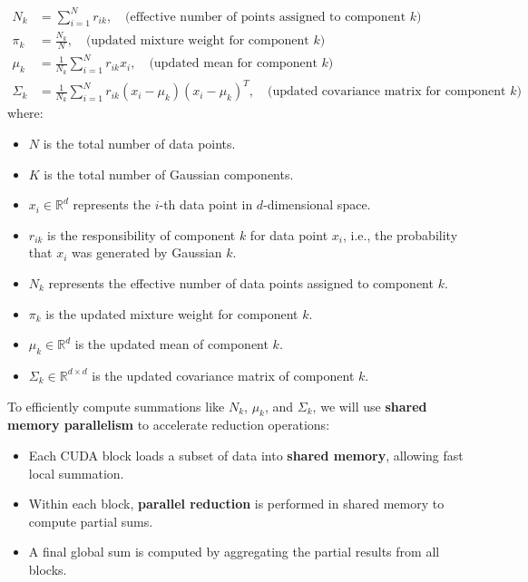 \documentclass{article}
\begin{document}
\begin{align}
    N_k &= \sum_{i=1}^{N} r_{ik}, \quad \text{(effective number of points assigned to component } k\text{)} \\
    \pi_k &= \frac{N_k}{N}, \quad \text{(updated mixture weight for component } k\text{)} \\
    \mu_k &= \frac{1}{N_k} \sum_{i=1}^{N} r_{ik} x_i, \quad \text{(updated mean for component } k\text{)} \\
    \Sigma_k &= \frac{1}{N_k} \sum_{i=1}^{N} r_{ik} (x_i - \mu_k)(x_i - \mu_k)^T, \quad \text{(updated covariance matrix for component } k\text{)}
\end{align}
where:
\begin{itemize}
    \item \( N \) is the total number of data points.
    \item \( K \) is the total number of Gaussian components.
    \item \( x_i \in \mathbb{R}^d \) represents the \( i \)-th data point in \( d \)-dimensional space.
    \item \( r_{ik} \) is the responsibility of component \( k \) for data point \( x_i \), i.e., the probability that \( x_i \) was generated by Gaussian \( k \).
    \item \( N_k \) represents the effective number of data points assigned to component \( k \).
    \item \( \pi_k \) is the updated mixture weight for component \( k \).
    \item \( \mu_k \in \mathbb{R}^d \) is the updated mean of component \( k \).
    \item \( \Sigma_k \in \mathbb{R}^{d \times d} \) is the updated covariance matrix of component \( k \).
\end{itemize}

To efficiently compute summations like \( N_k \), \( \mu_k \), and \( \Sigma_k \), we will use \textbf{shared memory parallelism} to accelerate reduction operations:
\begin{itemize}
    \item Each CUDA block loads a subset of data into \textbf{shared memory}, allowing fast local summation.
    \item Within each block, \textbf{parallel reduction} is performed in shared memory to compute partial sums.
    \item A final global sum is computed by aggregating the partial results from all blocks.
\end{itemize}
\end{document}
